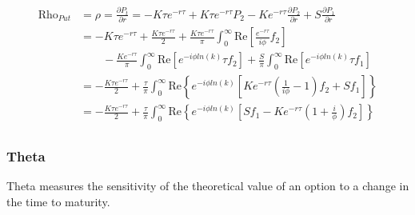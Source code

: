 \documentclass[a4paper]{article}
\begin{document}
\begin{align*}
	\mbox{Rho}_{Put} 
	& = \rho = \frac{\partial P_t}{\partial r} 
	= 
	- K\tau e^{-r\tau} + K\tau e^{-r\tau} P_2
	- K e^{-r\tau} \frac{\partial P_2}{\partial r}
	+ S\frac{\partial P_1}{\partial r} \\
	& 
	= 
	- K\tau e^{-r\tau}
	+ \frac{K\tau e^{-r\tau}}{2} 
	+ \frac{K\tau e^{-r\tau}}{\pi} \int_0^\infty \mbox{Re}\left[\frac{e^{-r\tau}}{i\phi} f_2 \right] \\
	&
	\quad \quad- \frac{Ke^{-r\tau}}{\pi} \int_0^\infty \mbox{Re}\left[e^{-i\phi ln(k)} \tau f_2 \right]
	+ \frac{S}{\pi} \int_0^\infty \mbox{Re}\left[e^{-i\phi ln(k)} \tau f_1 \right] \\
	&
	= 
	- \frac{K\tau e^{-r\tau}}{2} 
	+ \frac{\tau}{\pi} \int_0^\infty \mbox{Re}\left\{e^{-i\phi ln(k)} \left[Ke^{-r\tau} \left(\frac{1}{i\phi} - 1 \right)f_2 + Sf_1 \right] \right\} \\
	&
	=
	- \frac{K\tau e^{-r\tau}}{2} 
	+ \frac{\tau}{\pi} \int_0^\infty \mbox{Re}\left\{e^{-i\phi ln(k)} \left[Sf_1 - Ke^{-r\tau} \left(1 + \frac{i}{\phi} \right)f_2 \right] \right\} \\
\end{align*}





\newpage





\subsubsection*{Theta}

Theta measures the sensitivity of the theoretical value of an option to a change in the time to maturity.
\end{document}
